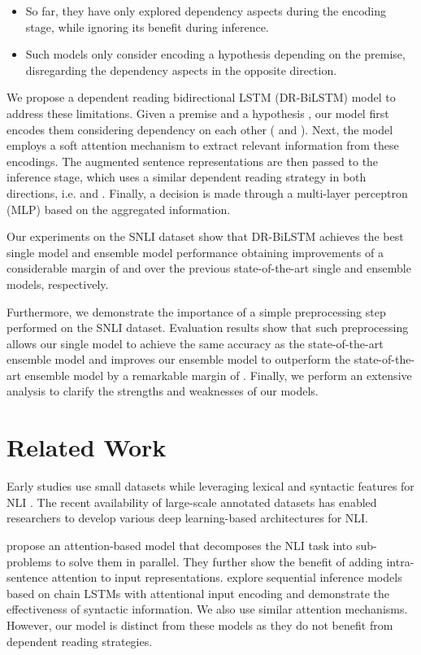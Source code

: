 \documentclass[11pt,a4paper]{article}
\begin{document}
	\begin{itemize}
		\item So far, they have only explored dependency aspects during the encoding stage, while ignoring its benefit during inference.
		\item Such models only consider encoding a hypothesis depending on the premise, disregarding the dependency aspects in the opposite direction.
	\end{itemize}
	
	We propose a dependent reading bidirectional LSTM (DR-BiLSTM) model to address these limitations. Given a premise  and a hypothesis , our model first encodes them considering dependency on each other ( and ). Next, the model employs a soft attention mechanism to extract relevant information from these encodings. The augmented sentence representations are then passed to the inference stage, which uses a similar dependent reading strategy in both directions, i.e.  and . Finally, a decision is made through a multi-layer perceptron (MLP) based on the aggregated information. 
	
	Our experiments on the SNLI dataset show that DR-BiLSTM achieves the best single model and ensemble model performance obtaining improvements of a considerable margin of  and  over the previous state-of-the-art single and ensemble models, respectively. 
	
	Furthermore, we demonstrate the importance of a simple preprocessing step performed on the SNLI dataset. Evaluation results show that such preprocessing allows our single model to achieve the same accuracy as the state-of-the-art ensemble model and improves our ensemble model to outperform the state-of-the-art ensemble model by a remarkable margin of . Finally, we perform an extensive analysis to clarify the strengths and weaknesses of our models. 
	
	\section{Related Work}
	Early studies use small datasets while leveraging lexical and syntactic features for NLI \cite{nli}. The recent availability of large-scale annotated datasets \cite{snli,multinli} has enabled researchers to develop various deep learning-based architectures for NLI. 
	
	\citet{google2016} propose an attention-based model \cite{nmt} that decomposes the NLI task into sub-problems to solve them in parallel. They further show the benefit of adding intra-sentence attention to input representations. \citet{him2017} explore sequential inference models based on chain LSTMs with attentional input encoding and demonstrate the effectiveness of syntactic information. We also use similar attention mechanisms. However, our model is distinct from these models as they do not benefit from dependent reading strategies.
	
\end{document}
